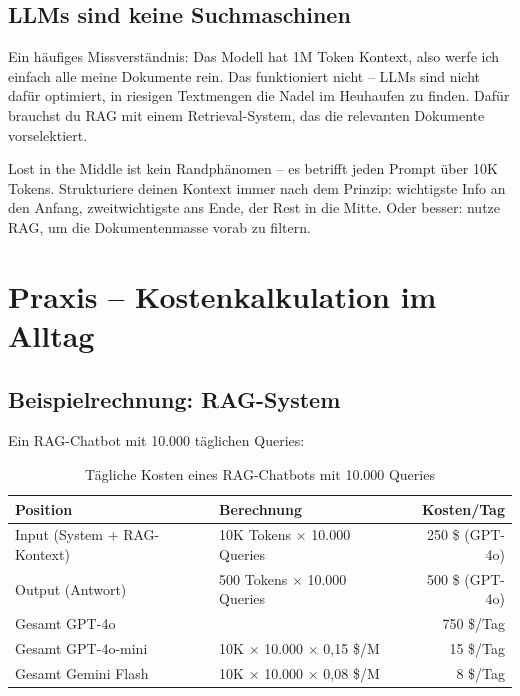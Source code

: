 \subsection{LLMs sind keine Suchmaschinen}

Ein häufiges Missverständnis: \glqq Das Modell hat 1M Token Kontext,
also werfe ich einfach alle meine Dokumente rein.\grqq{} Das funktioniert
nicht -- LLMs sind nicht dafür optimiert, in riesigen Textmengen die
Nadel im Heuhaufen zu finden. Dafür brauchst du RAG mit einem
Retrieval-System, das die relevanten Dokumente vorselektiert.

\begin{praxishinweis}
Lost in the Middle ist kein Randphänomen -- es betrifft jeden Prompt über 10K Tokens. Strukturiere deinen Kontext immer nach dem Prinzip: wichtigste Info an den Anfang, zweitwichtigste ans Ende, der Rest in die Mitte. Oder besser: nutze RAG, um die Dokumentenmasse vorab zu filtern.
\end{praxishinweis}

\section{Praxis -- Kostenkalkulation im Alltag}

\subsection{Beispielrechnung: RAG-System}

Ein RAG-Chatbot mit 10.000 täglichen Queries:

\begin{table}[H]
\centering
\begin{tabularx}{\linewidth}{lXr}
\toprule
\textbf{Position} & \textbf{Berechnung} & \textbf{Kosten/Tag} \\
\midrule
Input (System + RAG-Kontext) & 10K Tokens $\times$ 10.000 Queries & 250 \$ (GPT-4o) \\
Output (Antwort) & 500 Tokens $\times$ 10.000 Queries & 500 \$ (GPT-4o) \\
Gesamt GPT-4o & & 750 \$/Tag \\
Gesamt GPT-4o-mini & 10K $\times$ 10.000 $\times$ 0,15 \$/M & 15 \$/Tag \\
Gesamt Gemini Flash & 10K $\times$ 10.000 $\times$ 0,08 \$/M & 8 \$/Tag \\
\bottomrule
\end{tabularx}
\caption{Tägliche Kosten eines RAG-Chatbots mit 10.000 Queries}
\end{table}

